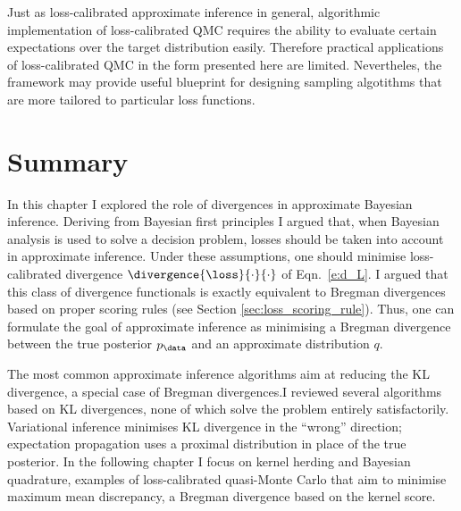 Just as loss-calibrated approximate inference in general, algorithmic implementation of loss-calibrated QMC requires the ability to evaluate certain expectations over the target distribution easily. Therefore practical applications of loss-calibrated QMC in the form presented here are limited. Nevertheles, the framework may provide useful blueprint for designing sampling algotithms that are more tailored to particular loss functions.

\section{Summary}

In this chapter I explored the role of divergences in approximate Bayesian inference. Deriving from Bayesian first principles I argued that, when Bayesian analysis is used to solve a decision problem, losses should be taken into account in approximate inference. Under these assumptions, one should minimise loss-calibrated divergence $\divergence{\loss}{\cdot}{\cdot}$ of Eqn.\ \eqref{e:d_L}. I argued that this class of divergence functionals is exactly equivalent to Bregman divergences based on proper scoring rules (see Section \ref{sec:loss_scoring_rule}). Thus, one can formulate the goal of approximate inference as minimising a Bregman divergence between the true posterior $p_{\data}$ and an approximate distribution $q$.

The most common approximate inference algorithms aim at reducing the KL divergence, a special case of Bregman divergences.I reviewed several algorithms based on KL divergences, none of which solve the problem entirely satisfactorily. Variational inference minimises KL divergence in the ``wrong'' direction; expectation propagation uses a proximal distribution in place of the true posterior. In the following chapter I focus on kernel herding and Bayesian quadrature, examples of loss-calibrated quasi-Monte Carlo that aim to minimise maximum mean discrepancy, a Bregman divergence based on the kernel score.